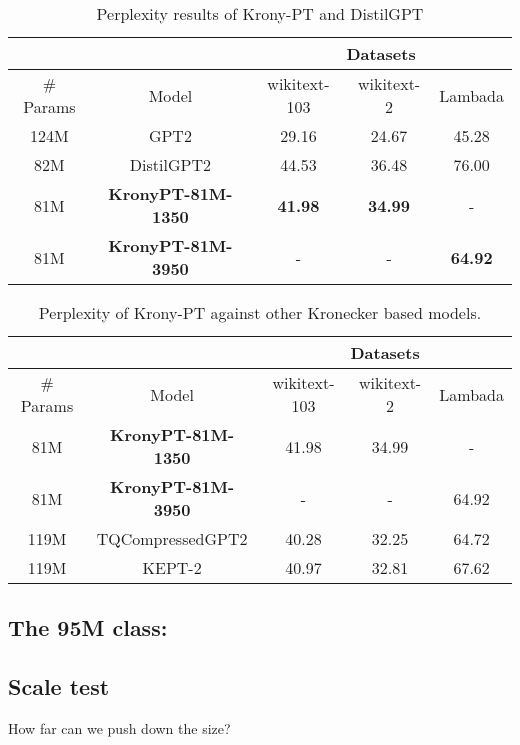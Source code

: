 \documentclass{article}
\begin{document}
{\begin{table}[h]
\centering
\begin{tabular}{|c|c|c|c|c|}
\hline
 & & \multicolumn{3}{c|}{Datasets} \\ \hline
\# Params &  Model            & wikitext-103 & wikitext-2 & Lambada \\ \hline
124M      & GPT2              & 29.16        & 24.67      & 45.28      \\ \hline
82M       & DistilGPT2        & 44.53        & 36.48      & 76.00      \\ \hline
81M       & \textbf{KronyPT-81M-1350}  & \textbf{41.98}   & \textbf{34.99}      & -          \\ \hline
81M       & \textbf{KronyPT-81M-3950}  & -            	  & -          & \textbf{64.92}      \\ \hline
\end{tabular}
\caption{Perplexity results of Krony-PT and DistilGPT}
\end{table}


\begin{table}[h]
\centering
\begin{tabular}{|c|c|c|c|c|}
\hline
 & & \multicolumn{3}{c|}{Datasets} \\ \hline
\# Params &  Model            & wikitext-103 & wikitext-2 & Lambada \\ \hline
81M       & \textbf{KronyPT-81M-1350}  & 41.98        & 34.99      & -          \\ \hline
81M       & \textbf{KronyPT-81M-3950}  & -            & -          & 64.92      \\ \hline
119M       & TQCompressedGPT2  & 40.28        & 32.25      & 64.72      \\ \hline
119M       & KEPT-2   & 40.97        & 32.81      & 67.62      \\ \hline
\end{tabular}
\caption{Perplexity of Krony-PT against other Kronecker based models.}
\end{table}

\subsection{The 95M class:}%
\label{sub:The 95M class:}

\subsection{Scale test}%
\label{sub:Scale test}
How far can we push down the size? 

}
\end{document}
